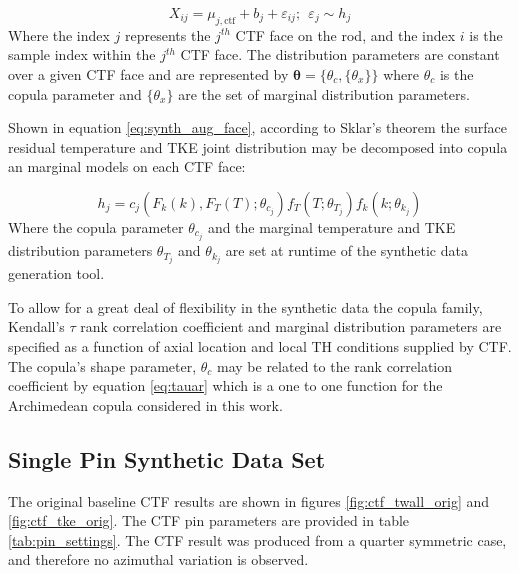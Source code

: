 \begin{equation}
    X_{ij} = \mu_{j,\mathrm{ctf}} + b_j + \varepsilon_{ij};\ \   \varepsilon_{j} \sim h_j
    \label{eq:synth_aug_discrete}
\end{equation}
Where the index $j$ represents the $j^{th}$ CTF face on the rod, and the index $i$ is the sample index within the $j^{th}$ CTF face.  The distribution parameters are constant over a given CTF face and are represented by $\bm \theta = \{\theta_c, \{\theta_x\}\}$ where $\theta_c$ is the copula parameter and  $\{\theta_x\}$ are the set of marginal distribution parameters.

Shown in equation \ref{eq:synth_aug_face}, according to Sklar's theorem the surface residual temperature and TKE joint distribution may be decomposed into copula an marginal models on each CTF face:

\begin{equation}
    h_j = c_j(F_k(k), F_T(T); \theta_{c_j}) f_{T}(T; \theta_{T_j}) f_{k}(k; \theta_{k_j})
    \label{eq:synth_aug_face}
\end{equation}
Where the copula parameter $\theta_{c_j}$ and the marginal temperature and TKE distribution parameters $\theta_{T_j}$ and $\theta_{k_j}$ are set at runtime of the synthetic data generation tool.

To allow for a great deal of flexibility in the synthetic data the copula family, Kendall's $\tau$ rank correlation coefficient and marginal distribution parameters are specified as a function of axial location and local TH conditions supplied by CTF.  The copula's shape parameter, $\theta_c$ may be related to the rank correlation coefficient by equation \ref{eq:tauar} which is a one to one function for the Archimedean copula considered in this work.


\subsection{Single Pin Synthetic Data Set}

The original baseline CTF results are shown in figures \ref{fig:ctf_twall_orig} and \ref{fig:ctf_tke_orig}.  The CTF pin parameters are provided in table \ref{tab:pin_settings}.  The CTF result was produced from a quarter symmetric case, and therefore no azimuthal variation is observed.

